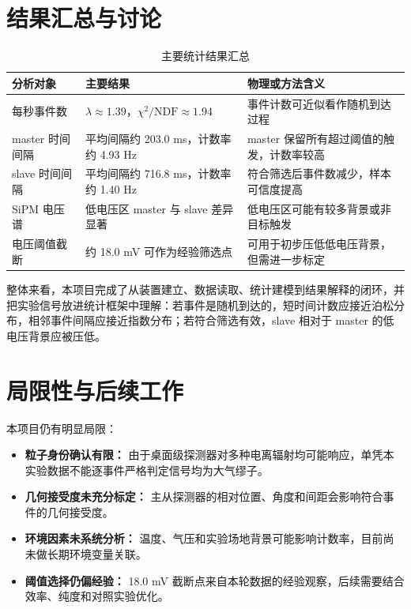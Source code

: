 \documentclass[11pt,a4paper]{ctexart}
\begin{document}
\section{结果汇总与讨论}

\begin{table}[H]
\centering
\caption{主要统计结果汇总}
\begin{tabularx}{\linewidth}{>{\raggedright\arraybackslash}p{3.3cm}>{\raggedright\arraybackslash}X>{\raggedright\arraybackslash}p{3.5cm}}
\toprule
分析对象 & 主要结果 & 物理或方法含义 \\
\midrule
每秒事件数 & $\lambda\approx 1.39$，$\chi^2/\mathrm{NDF}\approx 1.94$ & 事件计数可近似看作随机到达过程 \\
master 时间间隔 & 平均间隔约 203.0 ms，计数率约 4.93 Hz & master 保留所有超过阈值的触发，计数率较高 \\
slave 时间间隔 & 平均间隔约 716.8 ms，计数率约 1.40 Hz & 符合筛选后事件数减少，样本可信度提高 \\
SiPM 电压谱 & 低电压区 master 与 slave 差异显著 & 低电压区可能有较多背景或非目标触发 \\
电压阈值截断 & 约 18.0 mV 可作为经验筛选点 & 可用于初步压低低电压背景，但需进一步标定 \\
\bottomrule
\end{tabularx}
\end{table}

整体来看，本项目完成了从装置建立、数据读取、统计建模到结果解释的闭环，并把实验信号放进统计框架中理解：若事件是随机到达的，短时间计数应接近泊松分布，相邻事件间隔应接近指数分布；若符合筛选有效，slave 相对于 master 的低电压背景应被压低。

\section{局限性与后续工作}

本项目仍有明显局限：

\begin{itemize}
  \item \textbf{粒子身份确认有限：} 由于桌面级探测器对多种电离辐射均可能响应，单凭本实验数据不能逐事件严格判定信号均为大气缪子。
  \item \textbf{几何接受度未充分标定：} 主从探测器的相对位置、角度和间距会影响符合事件的几何接受度。
  \item \textbf{环境因素未系统分析：} 温度、气压和实验场地背景可能影响计数率，目前尚未做长期环境变量关联。
  \item \textbf{阈值选择仍偏经验：} 18.0 mV 截断点来自本轮数据的经验观察，后续需要结合效率、纯度和对照实验优化。
\end{itemize}
\end{document}
